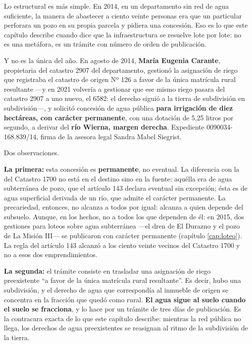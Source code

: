 \begin{cautela}
Lo estructural es más simple. En 2014, en un departamento sin red de agua suficiente, la manera de abastecer a ciento veinte personas era que un particular perforara un pozo en su propia parcela y pidiera una concesión. Eso es lo que este capítulo describe cuando dice que la infraestructura se resuelve lote por lote: no es una metáfora, es un trámite con número de orden de publicación.
\end{cautela}

Y no es la única del año. En agosto de 2014, \textbf{María Eugenia Carante}, propietaria del catastro 2907 del departamento, gestionó la asignación de riego que registraba el catastro de origen Nº 126 a favor de la única matrícula rural resultante ---y en 2021 volvería a gestionar que ese mismo riego pasara del catastro 2907 a uno nuevo, el 6582: el derecho siguió a la tierra de subdivisión en subdivisión---, y solicitó concesión de agua pública \textbf{para irrigación de diez hectáreas, con carácter permanente}, con una dotación de 5,25 litros por segundo, a derivar del \textbf{río Wierna, margen derecha}. Expediente 0090034-168.839/14, firma de la asesora legal Sandra Mabel Siegrist.

Dos observaciones.

\textbf{La primera:} esta concesión es \textbf{permanente}, no eventual. La diferencia con la del Catastro 1700 no está en el destino sino en la fuente: aquélla era de agua subterránea de pozo, que el artículo 143 declara eventual sin excepción; ésta es de agua superficial derivada de un río, que admite el carácter permanente. La precariedad, entonces, no alcanza a todos por igual: alcanza a quien depende del subsuelo. Aunque, en los hechos, no a todos los que dependen de él: en 2015, dos gestiones para loteos sobre agua subterránea ---el dren de El Durazno y el pozo de La Misión III--- se publicaron con carácter permanente (capítulo \ref{cap:loteo}). La regla del artículo 143 alcanzó a los ciento veinte vecinos del Catastro 1700 y no a esos dos emprendimientos.

\textbf{La segunda:} el trámite consiste en trasladar una asignación de riego preexistente ``a favor de la única matrícula rural resultante''. Es decir, hubo una subdivisión, y el derecho de agua que correspondía al inmueble de origen se concentra en la fracción que quedó como rural. \textbf{El agua sigue al suelo cuando el suelo se fracciona}, y lo hace por un trámite de tres días de publicación. Es la contracara exacta de lo que este capítulo describe: mientras la red pública no llega, los derechos de agua preexistentes se reasignan al ritmo de la subdivisión de la tierra.

